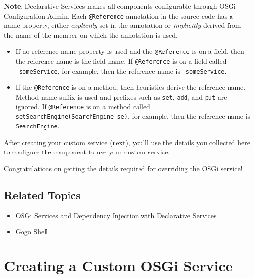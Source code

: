 \noindent\hrulefill

\textbf{Note}: Declarative Services makes all components configurable
through OSGi Configuration Admin. Each \texttt{@Reference} annotation in
the source code has a name property, either \emph{explicitly} set in the
annotation or \emph{implicitly} derived from the name of the member on
which the annotation is used.

\begin{itemize}
\tightlist
\item
  If no reference name property is used and the \texttt{@Reference} is
  on a field, then the reference name is the field name. If
  \texttt{@Reference} is on a field called \texttt{\_someService}, for
  example, then the reference name is \texttt{\_someService}.
\item
  If the \texttt{@Reference} is on a method, then heuristics derive the
  reference name. Method name suffix is used and prefixes such as
  \texttt{set}, \texttt{add}, and \texttt{put} are ignored. If
  \texttt{@Reference} is on a method called
  \texttt{setSearchEngine(SearchEngine\ se)}, for example, then the
  reference name is \texttt{SearchEngine}.
\end{itemize}

\noindent\hrulefill

After
\href{/docs/7-2/customization/-/knowledge_base/c/creating-a-custom-osgi-service}{creating
your custom service} (next), you'll use the details you collected here
to
\href{/docs/7-2/customization/-/knowledge_base/c/reconfiguring-components-to-use-your-service}{configure
the component to use your custom service}.

Congratulations on getting the details required for overriding the OSGi
service!

\section{Related Topics}\label{related-topics-31}

\begin{itemize}
\tightlist
\item
  \href{/docs/7-2/frameworks/-/knowledge_base/f/declarative-services}{OSGi
  Services and Dependency Injection with Declarative Services}
\item
  \href{/docs/7-2/customization/-/knowledge_base/c/using-the-felix-gogo-shell}{Gogo
  Shell}
\end{itemize}

\chapter{Creating a Custom OSGi
Service}\label{creating-a-custom-osgi-service}

